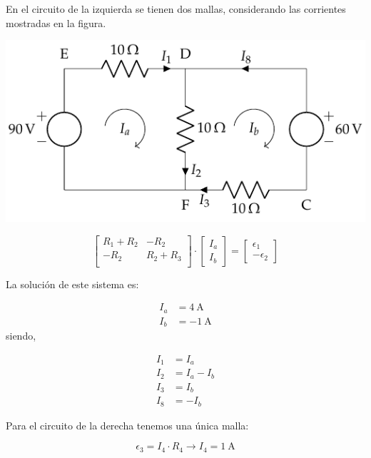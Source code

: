 En el circuito de la izquierda se tienen dos mallas, considerando las
corrientes mostradas en la figura.

\begin{center}
  \includegraphics{figuras/BT1_10_izq_mallas.pdf}
\end{center}


\begin{equation*}
  \begin{bmatrix}
    R_1 + R_2 & -R_2\\
    -R_2 & R_2 + R_3\\
  \end{bmatrix} \cdot %
  \begin{bmatrix}
    I_a\\
    I_b
  \end{bmatrix} = %
  \begin{bmatrix}
    \epsilon_1\\
    -\epsilon_2
  \end{bmatrix}
\end{equation*}

La solución de este sistema es:

\begin{align*}
  I_a &= \qty{4}{\ampere}\\
  I_b &= \qty{-1}{\ampere}
\end{align*}
siendo,

\begin{align*}
  I_1 &= I_a\\
  I_2 &= I_a - I_b\\
  I_3 &= I_b\\
  I_8 &= -I_b
\end{align*}

Para el circuito de la derecha tenemos una única malla:

\begin{equation*}
  \epsilon_3 = I_4 \cdot R_4 \rightarrow I_4 = \qty{1}{\ampere}
\end{equation*}

